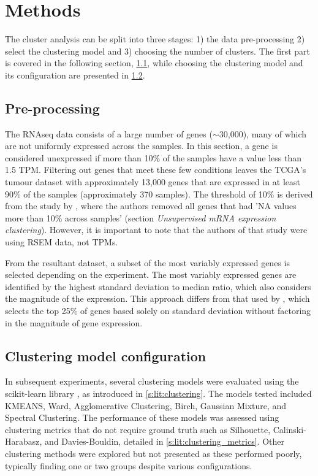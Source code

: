 \section{Methods} \label{s:cs:methods}



The cluster analysis can be split into three stages: 1) the data pre-processing 2) select the clustering model and 3) choosing the number of clusters. The first part is covered in the following section, \ref{s:cs:pre-processing}, while choosing the clustering model and its configuration are presented in \cref{s:cs:right_config}.


\subsection{Pre-processing} \label{s:cs:pre-processing}

The RNAseq data consists of a large number of genes ($\sim$30,000), many of which are not uniformly expressed across the samples. In this section, a gene is considered unexpressed if more than 10\% of the samples have a value less than 1.5 TPM. Filtering out genes that meet these few conditions leaves the TCGA's tumour dataset with approximately 13,000 genes that are expressed in at least 90\% of the samples (approximately 370 samples). The threshold of 10\% is derived from the study by \citet{Robertson2017-mg}, where the authors removed all genes that had 'NA values more than 10\% across samples' (section \textit{Unsupervised mRNA expression clustering}). However, it is important to note that the authors of that study were using RSEM data, not TPMs.

From the resultant dataset, a subset of the most variably expressed genes is selected depending on the experiment. The most variably expressed genes are identified by the highest standard deviation to median ratio, which also considers the magnitude of the expression. This approach differs from that used by \citet{Robertson2017-mg}, which selects the top 25\% of genes based solely on standard deviation without factoring in the magnitude of gene expression.


\subsection{Clustering model configuration} \label{s:cs:right_config}

In subsequent experiments, several clustering models were evaluated using the scikit-learn library \citep{Scikit-learn_undated-ax}, as introduced in \cref{s:lit:clustering}. The models tested included \gls{KMEANS}, Ward, Agglomerative Clustering, Birch, Gaussian Mixture, and Spectral Clustering. The performance of these models was assessed using clustering metrics that do not require ground truth such as Silhouette, Calinski-Harabasz, and Davies-Bouldin, detailed in \cref{s:lit:clustering_metrics}. Other clustering methods were explored but not presented as these performed poorly, typically finding one or two groups despite various configurations.


